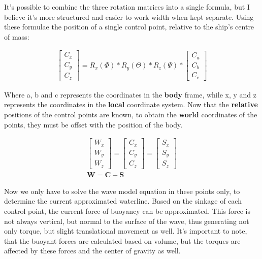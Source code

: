 It's possible to combine the three rotation matrices into a single formula, but I believe it's more structured and easier to work width when kept separate. Using these formulae the position of a single control point, relative to the ship's centre of mass:

\begin{align}
	\begin{bmatrix}
		C_x \\
		C_y \\
		C_z
	\end{bmatrix}

	 = R_x(\Phi) * R_y(\Theta) * R_z(\Psi) *
	\begin{bmatrix}
		C_a \\
		C_b \\
		C_c
	\end{bmatrix}

\end{align}

Where a, b and c represents the coordinates in the \textbf{body} frame, while x, y and z represents the coordinates in the \textbf{local} coordinate system. Now that the \textbf{relative} positions of the control points are known, to obtain the \textbf{world} coordinates of the points, they must be offset with the position of the body.

\begin{align}
	\begin{bmatrix}
		W_x \\
		W_y \\
		W_z
	\end{bmatrix}

	=
	\begin{bmatrix}
		C_x \\
		C_y \\
		C_z
	\end{bmatrix}

	 =
	\begin{bmatrix}
		S_x \\
		S_y \\
		S_z
	\end{bmatrix}
 \\

	\textbf{W} = \textbf{C} + \textbf{S}
\end{align}

Now we only have to solve the wave model equation in these points only, to determine the current approximated waterline. Based on the sinkage of each control point, the current force of buoyancy can be approximated. This force is not always vertical, but normal to the surface of the wave, thus generating not only torque, but slight translational movement as well. It's important to note, that the buoyant forces are calculated based on volume, but the torques are affected by these forces and the center of gravity as well.

